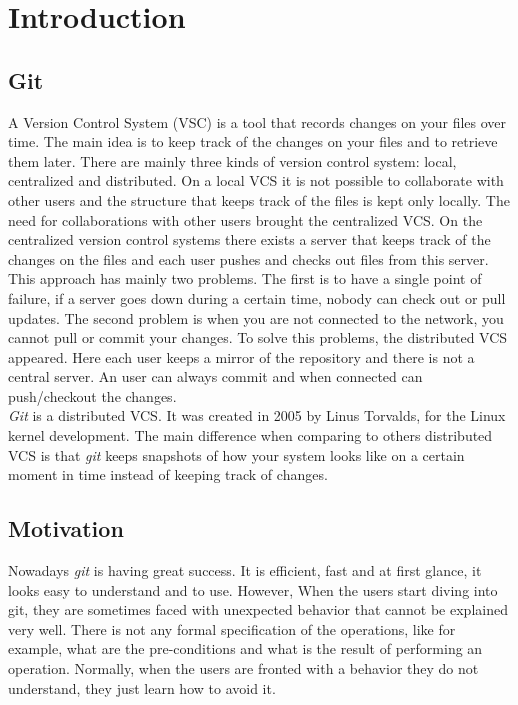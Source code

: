 
\chapter{Introduction}
\section{Git}
A Version Control System (VSC) is a tool that records changes on your
files over time. The main idea is to keep track of the changes on your
files and to retrieve them later. There are mainly three kinds of 
version control system: local, centralized and distributed. On
a local VCS it is not possible to collaborate with other users and
the structure that keeps track of the files is kept only locally. The
need for collaborations with other users brought the centralized VCS.
On the centralized version control systems there exists a server that keeps
track of the changes on the files and each user pushes and checks out files
from this server. This approach has mainly two problems. The
first is to have a single point of failure, if a server goes down
during a certain time, nobody can check out or pull updates. The
second problem is when you are not connected to the network, you
cannot pull or commit your changes. To solve this problems, the
distributed VCS appeared. Here each user keeps a mirror of the
repository and there is not a central server. An user can always commit
and when connected can push/checkout the changes.\\

\emph{Git} \cite{progit,gitComm,duanCharles,virtanemTommi,zackDennis} is a distributed VCS. It was created in 2005 by Linus Torvalds,
for the Linux kernel development. The main difference when comparing to
others distributed VCS is that \emph{git} keeps snapshots of how your system
looks like on a certain moment in time instead of keeping track of
changes.

\section{Motivation}
Nowadays \emph{git} is having great success. It is efficient, fast and
at first glance, it looks easy to understand and to use. However, When
the users start diving into git, they are sometimes faced with unexpected behavior that
cannot be explained very well. There is not any formal
specification of the operations, like for example, what are the pre-conditions and
what is the result of performing an operation. Normally, when the users
are fronted with a behavior they do not understand, they just learn how to avoid it.\\


